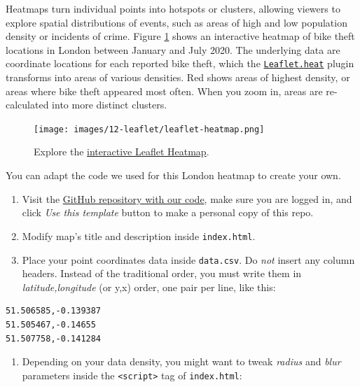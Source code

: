 \documentclass[
  english,
]{book}
\providecommand{\tightlist}{%
  \setlength{\itemsep}{0pt}\setlength{\parskip}{0pt}}
\begin{document}
Heatmaps turn individual points into hotspots or clusters, allowing viewers to explore
spatial distributions of events, such as areas of high and low population density or incidents of crime. Figure \ref{fig:leaflet-heatmap} shows an interactive heatmap of
bike theft locations in London between January and July 2020. The underlying
data are coordinate locations for each reported bike theft,
which the \href{https://github.com/Leaflet/Leaflet.heat}{\texttt{Leaflet.heat}} plugin transforms
into areas of various densities. Red shows areas of highest density, or areas
where bike theft appeared most often. When you zoom in, areas are re-calculated
into more distinct clusters.



\begin{figure}
\centering
\texttt{[image: images/12-leaflet/leaflet-heatmap.png]}
\caption{\label{fig:leaflet-heatmap}Explore the \href{https://handsondataviz.github.io/leaflet-heatmap/}{interactive Leaflet Heatmap}.}
\end{figure}

You can adapt the code we used for this London heatmap to create your own.

\begin{enumerate}
\def\labelenumi{\arabic{enumi}.}
\tightlist
\item
  Visit the \href{https://github.com/HandsOnDataViz/leaflet-heatmap}{GitHub repository with our code},
  make sure you are logged in, and click \emph{Use this template} button to make a personal copy of this repo.
\item
  Modify map's title and description inside \texttt{index.html}.
\item
  Place your point coordinates data inside \texttt{data.csv}. Do \emph{not} insert any column headers. Instead of the traditional order, you must write them in \emph{latitude,longitude} (or y,x) order, one pair per line, like this:
\end{enumerate}

\begin{verbatim}
51.506585,-0.139387
51.505467,-0.14655
51.507758,-0.141284
\end{verbatim}

\begin{enumerate}
\def\labelenumi{\arabic{enumi}.}
\setcounter{enumi}{3}
\tightlist
\item
  Depending on your data density, you might want to tweak \emph{radius} and \emph{blur} parameters
  inside the \texttt{\textless{}script\textgreater{}} tag of \texttt{index.html}:
\end{enumerate}
\end{document}
